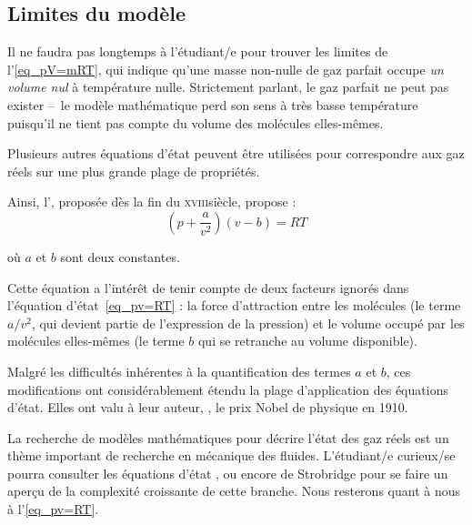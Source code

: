 	\subsection{Limites du modèle}

		Il ne faudra pas longtemps à l’étudiant/e pour trouver les limites de l’\cref{eq_pV=mRT}, qui indique qu’une masse non-nulle de gaz parfait occupe \textit{un volume nul} à température nulle. Strictement parlant, le gaz parfait ne peut pas exister --\ le modèle mathématique perd son sens à très basse température puisqu’il ne tient pas compte du volume des molécules elles-mêmes.

		Plusieurs autres équations d’état peuvent être utilisées pour correspondre aux gaz réels sur une plus grande plage de propriétés.

		Ainsi, l’, proposée dès la fin du \textsc{xviii}\ieme siècle, propose :
		\begin{equation}
			\left(p + \frac{a}{v ^2}\right) (v - b) = R T
		\end{equation}
		
		\begin{equationterms}
			\item où $a$ et $b$ sont deux constantes.
		\end{equationterms}

		Cette équation a l’intérêt de tenir compte de deux facteurs ignorés dans l’équation d’état~\ref{eq_pv=RT} : la force d’attraction entre les molécules (le terme $a/v^2$, qui devient partie de l’expression de la pression) et le volume occupé par les molécules elles-mêmes (le terme $b$ qui se retranche au volume disponible).

		Malgré les difficultés inhérentes à la quantification des termes $a$ et  $b$, ces modifications ont considérablement étendu la plage d’application des équations d’état. Elles ont valu à leur auteur, , le prix Nobel de physique en 1910.

		La recherche de modèles mathématiques pour décrire l’état des gaz réels est un thème important de recherche en mécanique des fluides. L’étudiant/e curieux/se pourra consulter les équations d’état ,  ou encore de Strobridge pour se faire un aperçu de la complexité croissante de cette branche. Nous resterons quant à nous à l’\cref{eq_pv=RT}.



